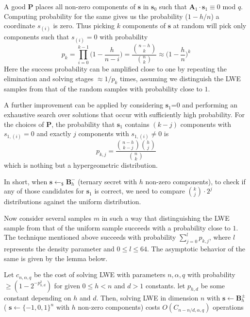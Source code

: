 A good $\pmb{P}$ places all non-zero components of $\pmb{s}$ in $\pmb{s}_0$ such that $\pmb{A}_1\cdot \pmb{s}_1 \equiv 0$ mod $q$. Computing probability for the same gives us the probability
($1-h/n$) a coordinate $s_{(i)}$ is zero. Thus picking $k$ components of $\pmb{s}$ at random will pick only components such that $s_{(i)}=0$ with probability
\begin{equation*}
    p_k = \prod^{k-1}_{i=0} \Big(1- \frac{h}{n-i}\Big)=\frac{ \binom {n-h}k}{\binom nk} \approx \Big(1- \frac{h}{n}\Big)^k
\end{equation*}
Here the success probability can be amplified close to one by repeating the elimination and solving stages $\approx 1/p_k$ times, assuming we distinguish the LWE samples from that of the random samples with probability close to $1$.

A further improvement can be applied by considering $\pmb{s}_1$=0 and performing an exhaustive search over solutions that occur with sufficiently high probability. For the choices of $\pmb{P}$, the probability that $\pmb{s}_1$ contains $(k-j)$ components with $s_{1,(i)}= 0$ and exactly $j$ components with $s_{1,(i)} \neq 0$ is
\begin{equation*}
    p_{k,j} = \frac{\binom{n-h}{k-j} \binom{h}{j}}{\binom{n}{k}}
\end{equation*}
which is nothing but a hypergeometric distribution.

In short, when $\pmb{s} \leftarrow_{\$} \pmb{B}_h^-$ (ternary secret with $h$ non-zero components), to check if any of those candidates for $\pmb{s}_1$ is correct, we need to compare $\binom{k}{j} \cdot 2^j$ distributions against the uniform distribution.

Now consider several samples $m$ in such a way that distinguishing the LWE sample from that of the uniform sample succeeds with a probability close to $1$. The technique mentioned above succeeds with probability $\sum^l_{j=0} p_{k,j}$, where $l$ represents the density parameter and $0 \leq l \leq 64$. The asymptotic behavior of the same is given by the lemma below.
\begin{lemma}
    Let $c_{n,\alpha,q}$ be the cost of solving LWE with parameters $n, \alpha, q$ with probability $\geq (1-2^{-p^2_{h,d}})$ for given $0 \leq h < n$ and $d>1$ constants. let $p_{h,d}$ be some constant depending on $h$ and $d$. Then, solving LWE in dimension $n$ with
    $\pmb{s} \leftarrow \pmb{B}_h^{\pm}$ ( $\pmb{s} \leftarrow \{-1,0,1\}^n$ with $h$ non-zero components) costs $O(C_{n-n/d,\alpha,q})$ operations
\end{lemma}

